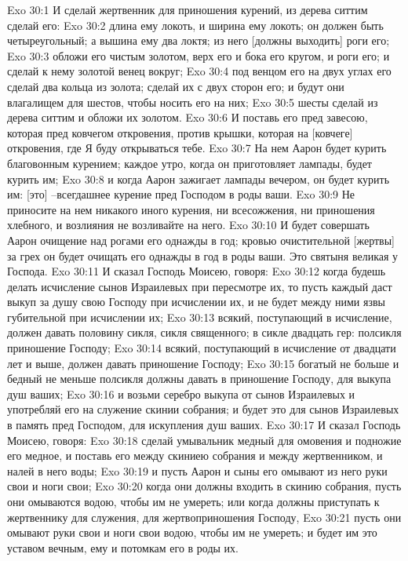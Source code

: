 Exo 30:1  И сделай жертвенник для приношения курений, из дерева ситтим сделай его:
Exo 30:2  длина ему локоть, и ширина ему локоть; он должен быть четыреугольный; а вышина ему два локтя; из него [должны выходить] роги его;
Exo 30:3  обложи его чистым золотом, верх его и бока его кругом, и роги его; и сделай к нему золотой венец вокруг;
Exo 30:4  под венцом его на двух углах его сделай два кольца из золота; сделай их с двух сторон его; и будут они влагалищем для шестов, чтобы носить его на них;
Exo 30:5  шесты сделай из дерева ситтим и обложи их золотом.
Exo 30:6  И поставь его пред завесою, которая пред ковчегом откровения, против крышки, которая на [ковчеге] откровения, где Я буду открываться тебе.
Exo 30:7  На нем Аарон будет курить благовонным курением; каждое утро, когда он приготовляет лампады, будет курить им;
Exo 30:8  и когда Аарон зажигает лампады вечером, он будет курить им: [это] --всегдашнее курение пред Господом в роды ваши.
Exo 30:9  Не приносите на нем никакого иного курения, ни всесожжения, ни приношения хлебного, и возлияния не возливайте на него.
Exo 30:10  И будет совершать Аарон очищение над рогами его однажды в год; кровью очистительной [жертвы] за грех он будет очищать его однажды в год в роды ваши. Это святыня великая у Господа.
Exo 30:11  И сказал Господь Моисею, говоря:
Exo 30:12  когда будешь делать исчисление сынов Израилевых при пересмотре их, то пусть каждый даст выкуп за душу свою Господу при исчислении их, и не будет между ними язвы губительной при исчислении их;
Exo 30:13  всякий, поступающий в исчисление, должен давать половину сикля, сикля священного; в сикле двадцать гер: полсикля приношение Господу;
Exo 30:14  всякий, поступающий в исчисление от двадцати лет и выше, должен давать приношение Господу;
Exo 30:15  богатый не больше и бедный не меньше полсикля должны давать в приношение Господу, для выкупа душ ваших;
Exo 30:16  и возьми серебро выкупа от сынов Израилевых и употребляй его на служение скинии собрания; и будет это для сынов Израилевых в память пред Господом, для искупления душ ваших.
Exo 30:17  И сказал Господь Моисею, говоря:
Exo 30:18  сделай умывальник медный для омовения и подножие его медное, и поставь его между скиниею собрания и между жертвенником, и налей в него воды;
Exo 30:19  и пусть Аарон и сыны его омывают из него руки свои и ноги свои;
Exo 30:20  когда они должны входить в скинию собрания, пусть они омываются водою, чтобы им не умереть; или когда должны приступать к жертвеннику для служения, для жертвоприношения Господу,
Exo 30:21  пусть они омывают руки свои и ноги свои водою, чтобы им не умереть; и будет им это уставом вечным, ему и потомкам его в роды их.
